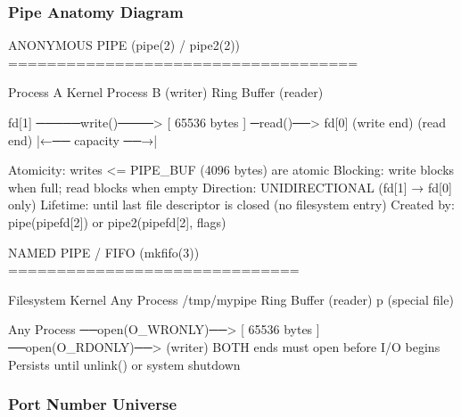 \documentclass[11pt,letterpaper]{article}
\begin{document}
\subsubsection{Pipe Anatomy Diagram}

\begin{asciibox}
ANONYMOUS PIPE (pipe(2) / pipe2(2))
====================================

 Process A                     Kernel                      Process B
 (writer)                    Ring Buffer                   (reader)
                           
  fd[1]   ─────write()────>  [  65536 bytes  ]  ─read()──>  fd[0]
 (write end)                                               (read end)
                             |←── capacity ──→|
                                 
  Atomicity:  writes <= PIPE_BUF (4096 bytes) are atomic
  Blocking:   write blocks when full; read blocks when empty
  Direction:  UNIDIRECTIONAL (fd[1] → fd[0] only)
  Lifetime:   until last file descriptor is closed (no filesystem entry)
  Created by: pipe(pipefd[2])  or  pipe2(pipefd[2], flags)
  
NAMED PIPE / FIFO (mkfifo(3))
==============================

  Filesystem                   Kernel                  Any Process
  /tmp/mypipe                Ring Buffer                 (reader)
      p (special file)
  
  Any Process  ──open(O_WRONLY)──> [  65536 bytes  ] ──open(O_RDONLY)──>
   (writer)                          
                                 BOTH ends must open before I/O begins
                             Persists until unlink() or system shutdown
\end{asciibox}

\subsubsection{Port Number Universe}
\end{document}
